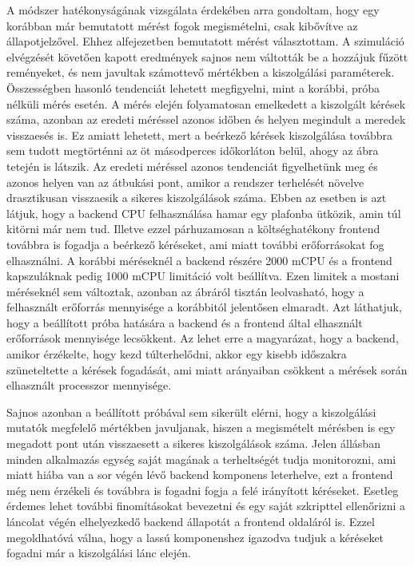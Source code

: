 A módszer hatékonyságának vizsgálata érdekében arra gondoltam, hogy egy korábban már bemutatott mérést fogok megismételni, csak kibővítve az állapotjelzővel.
Ehhez  alfejezetben bemutatott mérést választottam.
A szimuláció elvégzését követően kapott eredmények sajnos nem váltották be a hozzájuk fűzött reményeket, és nem javultak számottevő mértékben a kiszolgálási paraméterek.
Összességben hasonló tendenciát lehetett megfigyelni, mint a korábbi, próba nélküli mérés esetén. 
A mérés elején folyamatosan emelkedett a kiszolgált kérések száma, azonban az eredeti méréssel azonos időben és helyen megindult a meredek visszaesés is.
Ez amiatt lehetett, mert a beérkező kérések kiszolgálása továbbra sem tudott megtörténni az öt másodperces időkorláton belül, ahogy az  ábra tetején is látszik.
Az eredeti méréssel azonos tendenciát figyelhetünk meg és azonos helyen van az átbukási pont, amikor a rendszer terhelését növelve drasztikusan visszaesik a sikeres kiszolgálások száma.
Ebben az esetben is azt látjuk, hogy a backend CPU felhasználása hamar egy plafonba ütközik, amin túl kitörni már nem tud.
Illetve ezzel párhuzamosan a költséghatékony frontend továbbra is fogadja a beérkező kéréseket, ami miatt további erőforrásokat fog elhasználni.
A korábbi méréseknél a backend részére 2000 mCPU és a frontend kapszuláknak pedig 1000 mCPU limitáció volt beállítva.
Ezen limitek a mostani méréseknél sem változtak, azonban az ábráról tisztán leolvasható, hogy a felhasznált erőforrás mennyisége a korábbitól jelentősen elmaradt.
Azt láthatjuk, hogy a beállított próba hatására a backend és a frontend által elhasznált erőforrások mennyisége lecsökkent.
Az lehet erre a magyarázat, hogy a backend, amikor érzékelte, hogy kezd túlterhelődni, akkor egy kisebb időszakra szüneteltette a kérések fogadását, ami miatt arányaiban csökkent a mérések során elhasznált processzor mennyisége.

Sajnos azonban a beállított próbával sem sikerült elérni, hogy a kiszolgálási mutatók megfelelő mértékben javuljanak, hiszen a megismételt mérésben is egy megadott pont után visszaesett a sikeres kiszolgálások száma. Jelen állásban minden alkalmazás egység saját magának a terheltségét tudja monitorozni, ami miatt hiába van a sor végén lévő backend komponens leterhelve, ezt a frontend még nem érzékeli és továbbra is fogadni fogja a felé irányított kéréseket.
Esetleg érdemes lehet további finomításokat bevezetni és egy saját szkripttel ellenőrizni a láncolat végén elhelyezkedő backend állapotát a frontend oldaláról is.
Ezzel megoldhatóvá válna, hogy a lassú komponenshez igazodva tudjuk a kéréseket fogadni már a kiszolgálási lánc elején.

